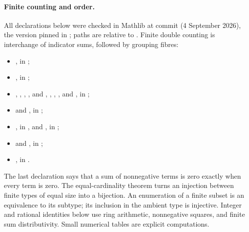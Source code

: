 \begin{mergedproofsection}
\paragraph{Finite counting and order.}
\uses{}
All declarations below were checked in Mathlib at commit
 (4 September 2026), the version pinned in
; paths are relative to . Finite double counting is
interchange of indicator sums, followed by grouping fibres:
\begin{itemize}
 \item {}, in
 ;
 \item {}, in
 ;
 \item {},
 ,
 , , and
 , ,
 , , and
 , in ;
 \item {} and
 , in ;
 \item {}, in ,
 and , in ;
 \item {} and , in
 ;
 \item {}, in
 .
\end{itemize}
The last declaration says that a sum of nonnegative terms is zero
exactly when every term is zero. The equal-cardinality theorem turns
an injection between finite types of equal size into a bijection.
An enumeration of a finite subset is an equivalence to its subtype;
its inclusion in the ambient type is injective. Integer and rational
identities below use ring arithmetic, nonnegative squares, and finite
sum distributivity. Small numerical tables are explicit computations.


\end{mergedproofsection}
